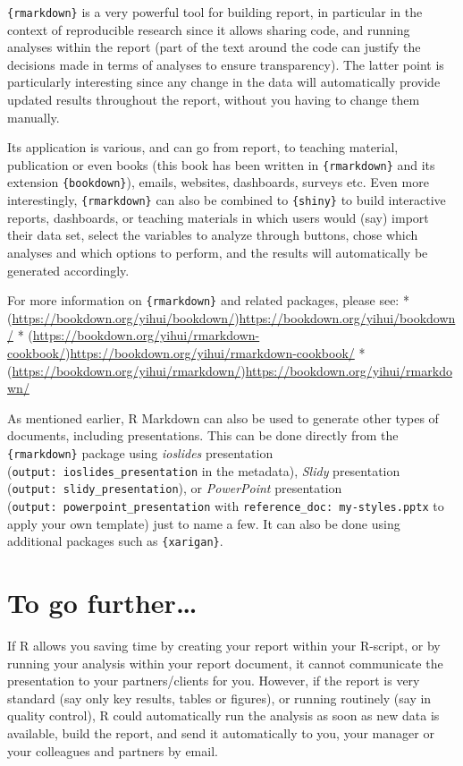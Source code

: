 \documentclass[
]{krantz}
\begin{document}
\texttt{\{rmarkdown\}} is a very powerful tool for building report, in particular in the context of reproducible research since it allows sharing code, and running analyses within the report (part of the text around the code can justify the decisions made in terms of analyses to ensure transparency). The latter point is particularly interesting since any change in the data will automatically provide updated results throughout the report, without you having to change them manually.

Its application is various, and can go from report, to teaching material, publication or even books (this book has been written in \texttt{\{rmarkdown\}} and its extension \texttt{\{bookdown\}}), emails, websites, dashboards, surveys etc. Even more interestingly, \texttt{\{rmarkdown\}} can also be combined to \texttt{\{shiny\}} to build interactive reports, dashboards, or teaching materials in which users would (say) import their data set, select the variables to analyze through buttons, chose which analyses and which options to perform, and the results will automatically be generated accordingly.

For more information on \texttt{\{rmarkdown\}} and related packages, please see:
* (\url{https://bookdown.org/yihui/bookdown/})\url{https://bookdown.org/yihui/bookdown/}
* (\url{https://bookdown.org/yihui/rmarkdown-cookbook/})\url{https://bookdown.org/yihui/rmarkdown-cookbook/}
* (\url{https://bookdown.org/yihui/rmarkdown/})\url{https://bookdown.org/yihui/rmarkdown/}

As mentioned earlier, R Markdown can also be used to generate other types of documents, including presentations. This can be done directly from the \texttt{\{rmarkdown\}} package using \emph{ioslides} presentation (\texttt{output:\ ioslides\_presentation} in the metadata), \emph{Slidy} presentation (\texttt{output:\ slidy\_presentation}), or \emph{PowerPoint} presentation (\texttt{output:\ powerpoint\_presentation} with \texttt{reference\_doc:\ my-styles.pptx} to apply your own template) just to name a few. It can also be done using additional packages such as \texttt{\{xarigan\}}.

\hypertarget{to-go-further}{%
\section{To go further\ldots{}}\label{to-go-further}}

If R allows you saving time by creating your report within your R-script, or by running your analysis within your report document, it cannot communicate the presentation to your partners/clients for you. However, if the report is very standard (say only key results, tables or figures), or running routinely (say in quality control), R could automatically run the analysis as soon as new data is available, build the report, and send it automatically to you, your manager or your colleagues and partners by email.
\end{document}
